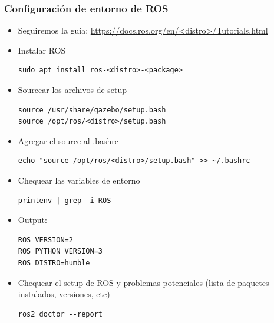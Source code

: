 \begin{frame}[fragile]
	\frametitle{Configuración de entorno de ROS}
    \scriptsize
    \begin{itemize}
        \item Seguiremos la guía: \href{https://docs.ros.org/en/<distro>/Tutorials.html}{https://docs.ros.org/en/<distro>/Tutorials.html}
        \item Instalar ROS
        \begin{lstlisting}[style=bash]
sudo apt install ros-<distro>-<package>
        \end{lstlisting}

        \item Sourcear los archivos de setup
        \begin{lstlisting}[style=bash]source /usr/share/gazebo/setup.bash
source /opt/ros/<distro>/setup.bash
        \end{lstlisting}

        \item Agregar el source al .bashrc
        \begin{lstlisting}[style=bash]
echo "source /opt/ros/<distro>/setup.bash" >> ~/.bashrc
        \end{lstlisting}

        \item Chequear las variables de entorno
        \begin{lstlisting}[style=bash]
printenv | grep -i ROS
        \end{lstlisting}

        \item Output:
        \begin{lstlisting}[style=bash]
ROS_VERSION=2
ROS_PYTHON_VERSION=3
ROS_DISTRO=humble
        \end{lstlisting}	
        
        \item Chequear el setup de ROS y problemas potenciales (lista de paquetes instalados, versiones, etc)
        
        \begin{lstlisting}[style=bash]
ros2 doctor --report
        \end{lstlisting}
    \end{itemize} 

    

\end{frame}

